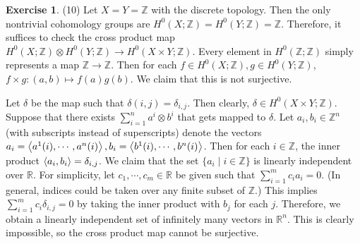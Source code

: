 \documentclass[12pt, psamsfonts]{amsart}
\theoremstyle{definition}
\newtheorem*{exer}{Exercise}
\theoremstyle{remark}
\numberwithin{equation}{section}
\begin{document}
\begin{exer}{(10)}
  Let $X = Y = \mathbb{Z}$ with the discrete topology.
  Then the only nontrivial cohomology groups are $H^0(X; \mathbb{Z}) = H^0(Y; \mathbb{Z}) = \mathbb{Z}$.
  Therefore, it suffices to check the cross product map $H^0(X; \mathbb{Z}) \otimes H^0(Y; \mathbb{Z}) \rightarrow H^0(X \times Y; \mathbb{Z})$.
  Every element in $H^0(\mathbb{Z}; \mathbb{Z})$ simply represents a map $\mathbb{Z} \rightarrow \mathbb{Z}$.
  Then for each $f \in H^0(X; \mathbb{Z}), g \in H^0(Y; \mathbb{Z})$, $f \times g: (a, b) \mapsto f(a)g(b)$.
  We claim that this is not surjective.

  Let $\delta$ be the map such that $\delta(i, j) = \delta_{i, j}$.
  Then clearly, $\delta \in H^0(X \times Y; \mathbb{Z})$.
  Suppose that there exists $\sum_{i=1}^{n} a^i \otimes b^i$ that gets mapped to $\delta$.
  Let $a_i, b_i \in \mathbb{Z}^n$ (with subscripts instead of superscripts) denote the vectors $a_i = \ev{a^1(i), \cdots, a^n(i)}, b_i = \ev{b^1(i), \cdots, b^n(i)}$.
  Then for each $i \in \mathbb{Z}$, the inner product $\ev{a_i, b_i} = \delta_{i, j}$.
  We claim that the set $\{ a_i \mid i \in \mathbb{Z} \}$ is linearly independent over $\mathbb{R}$.
  For simplicity, let $c_1, \cdots, c_m \in \mathbb{R}$ be given such that $\sum_{i=1}^{m} c_ia_i = 0$.
  (In general, indices could be taken over any finite subset of $\mathbb{Z}$.)
  This implies $\sum_{i=1}^{m} c_i\delta_{i, j} = 0$ by taking the inner product with $b_j$ for each $j$.
  Therefore, we obtain a linearly independent set of infinitely many vectors in $\mathbb{R}^n$.
  This is clearly impossible, so the cross product map cannot be surjective.
\end{exer}
\end{document}
